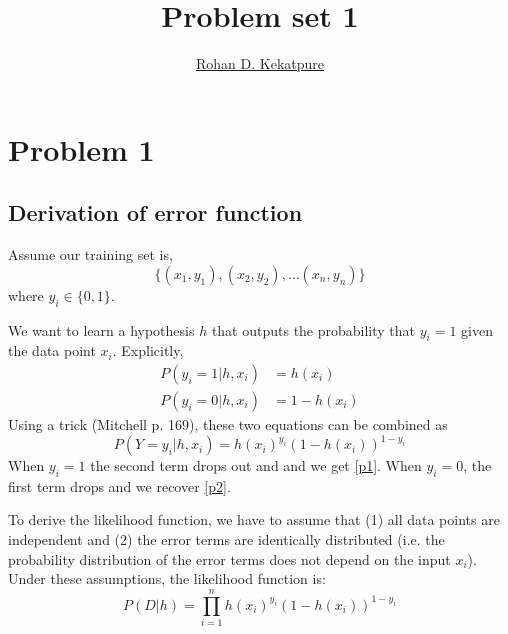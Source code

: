 \documentclass[10pt,letterpaper]{article}
\begin{document}
\title{\Large{Problem set 1}}
\author{\href{mailto:rohan.kekatpure@gmail.com}{Rohan D. Kekatpure}}
\address{}
\email{}

%
%

\section{Problem 1}
\subsection{Derivation of error function}
Assume our training set is, 
\begin{equation}
	\{(x_1, y_1), (x_2, y_2), \ldots (x_n, y_n)\}
\end{equation}
where $y_i \in \{0, 1\}$. 

We want to learn a hypothesis $h$ that outputs the probability that $y_i = 1$ given the data point $x_i$. Explicitly, 
\begin{align}
  P(y_i = 1|h, x_i) &= h(x_i) \label{p1}\\
  P(y_i = 0|h, x_i) &= 1 - h(x_i) \label{p2}
\end{align}
Using a trick (Mitchell p. 169), these two equations can be combined as
\begin{equation}
	P(Y=y_i|h, x_i) = h(x_i)^{y_i}(1-h(x_i))^{1-y_i}
\end{equation}
When $y_i=1$ the second term drops out and and we get \eqref{p1}. When $y_i = 0$, the first term drops and we recover \eqref{p2}.

To derive the likelihood function, we have to assume that (1) all data points are independent and (2) the error terms are identically distributed (i.e. the probability distribution of the error terms does not depend on the input $x_i$). Under these assumptions, the likelihood function is:
\begin{equation}
  \label{lk1}
  P(D|h) = \prod_{i=1}^{n} h(x_i)^{y_i}(1-h(x_i))^{1-y_i}
\end{equation}
\end{document}
